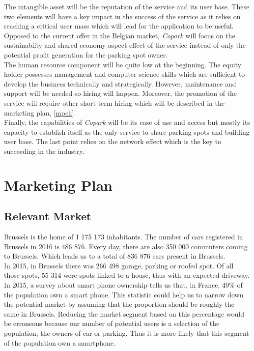\documentclass[12pt,a4paper,oneside]{book}
\newcommand{\bp}{\textit{Copark }}
\begin{document}
The intangible asset will be the reputation of the service and its user base. These two elements will have a key impact in the success of the service as it relies on reaching a critical user mass which will lead for the application to be useful. Opposed to the current offer in the Belgian market, \bp will focus on the sustainabilty and shared economy aspect effect of the service instead of only the potential profit generation for the parking spot owner.\\

The human resource component will be quite low at the beginning. The equity holder possesses management and computer science skills which are sufficient to develop the business technically and strategically. However, maintenance and support will be needed so hiring will happen. Moreover, the promotion of the service will require other short-term hiring which will be described in the marketing plan, \autoref{mpch}.\\

Finally, the capabilities of \bp will be its ease of use and access but mostly its capacity to establish itself as the only service to share parking spots and building user base. The last point relies on the network effect which is the key to succeeding in the industry.

\chapter{Marketing Plan}

\section{Relevant Market}
\label{rmar}
Brussels is the home of 1 175 173\cite{ciafb} inhabitants. The number of cars registered in Brussels in 2016 is 486 876.\cite{mtvr} Every day, there are also 350 000 commuters coming to Brussels.\cite{bxcommu} Which leads us to a total of 836 876 cars present in Brussels.\\
In 2015, in Brussels there was 266 498 garage, parking or roofed spot. Of all those spots, 55 314 were spots linked to a house, thus with an expected driveway.\cite{atpb}\\

In 2015, a survey about smart phone ownership tells us that, in France, 49\% of the population own a smart phone.\cite{spown} This statistic could help us to narrow down the potential market by assuming that the proportion should be roughly the same in Brussels. Reducing the market segment based on this percentage would be erroneous because our number of potential users is a selection of the population, the owners of car or parking. Thus it is more likely that this segment of the population own a smartphone.\\
\end{document}
